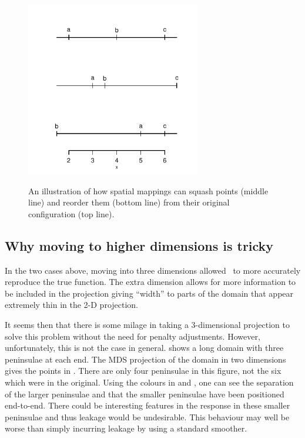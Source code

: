 \begin{figure}
\centering
\includegraphics[width=3in]{mds/figs/linedia.pdf} \\
\caption{An illustration of how spatial mappings can squash points (middle line) and reorder them (bottom line) from their original configuration (top line).}
\label{linedia}
\end{figure}

\subsection{Why moving to higher dimensions is tricky}
\label{nohigherdim}

In the two cases above, moving into three dimensions allowed \mdsap\ to more accurately reproduce the true function. The extra dimension allows for more information to be included in the projection giving ``width'' to parts of the domain that appear extremely thin in the 2-D projection.

It seems then that there is some milage in taking a 3-dimensional projection to solve this problem without the need for penalty adjustments. However, unfortunately, this is not the case in general.  shows a long domain with three peninsulae at each end. The MDS projection of the domain in two dimensions gives the points in . There are only four peninsulae in this figure, not the six which were in the original. Using the colours in  and , one can see the separation of the larger peninsulae and that the smaller peninsulae have been positioned end-to-end. There could be interesting features in the response in these smaller peninsulae and thus leakage would be undesirable. This behaviour may well be worse than simply incurring leakage by using a standard smoother.

